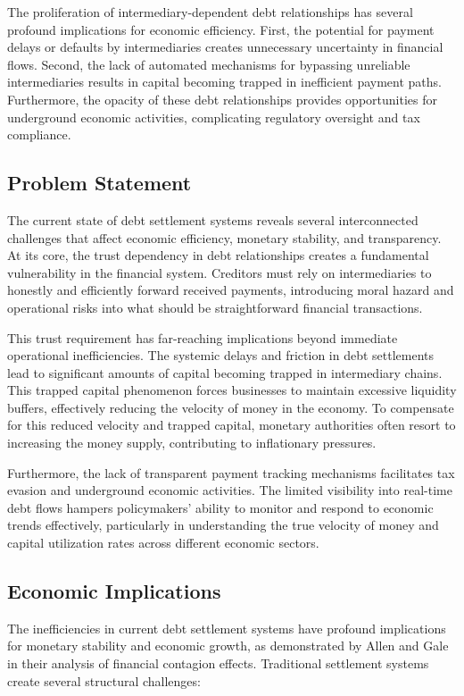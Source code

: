 \documentclass[twocolumn,10pt,a4paper]{article}
\begin{document}
The proliferation of intermediary-dependent debt relationships has several profound implications for economic efficiency. First, the potential for payment delays or defaults by intermediaries creates unnecessary uncertainty in financial flows. Second, the lack of automated mechanisms for bypassing unreliable intermediaries results in capital becoming trapped in inefficient payment paths. Furthermore, the opacity of these debt relationships provides opportunities for underground economic activities, complicating regulatory oversight and tax compliance.

\subsection{Problem Statement}
The current state of debt settlement systems reveals several interconnected challenges that affect economic efficiency, monetary stability, and transparency. At its core, the trust dependency in debt relationships creates a fundamental vulnerability in the financial system. Creditors must rely on intermediaries to honestly and efficiently forward received payments, introducing moral hazard and operational risks into what should be straightforward financial transactions.

This trust requirement has far-reaching implications beyond immediate operational inefficiencies. The systemic delays and friction in debt settlements lead to significant amounts of capital becoming trapped in intermediary chains. This trapped capital phenomenon forces businesses to maintain excessive liquidity buffers, effectively reducing the velocity of money in the economy. To compensate for this reduced velocity and trapped capital, monetary authorities often resort to increasing the money supply, contributing to inflationary pressures.

Furthermore, the lack of transparent payment tracking mechanisms facilitates tax evasion and underground economic activities. The limited visibility into real-time debt flows hampers policymakers' ability to monitor and respond to economic trends effectively, particularly in understanding the true velocity of money and capital utilization rates across different economic sectors.

\subsection{Economic Implications}
The inefficiencies in current debt settlement systems have profound implications for monetary stability and economic growth, as demonstrated by Allen and Gale \cite{allen2000financial} in their analysis of financial contagion effects. Traditional settlement systems create several structural challenges:
\end{document}
